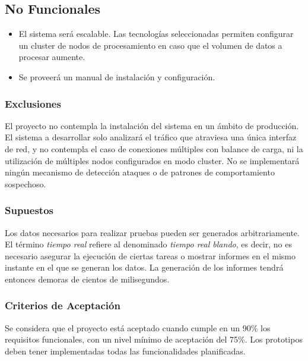 \subsection*{No Funcionales}
\begin{itemize}
	\item El sistema será escalable. Las tecnologías seleccionadas permiten configurar un cluster de nodos de procesamiento en caso que el volumen de datos a procesar aumente.
	\item Se proveerá un manual de instalación y configuración.
\end{itemize}
 
\subsubsection{Exclusiones}
El proyecto no contempla la instalación del sistema en un ámbito de producción. El sistema a desarrollar solo analizará el tráfico que atraviesa una única interfaz de red, y no contempla el caso de conexiones múltiples con balance de carga, ni la utilización de múltiples nodos configurados en modo cluster. No se implementará ningún mecanismo de detección ataques o de patrones de comportamiento sospechoso.

\subsubsection{Supuestos}
Los datos necesarios para realizar pruebas pueden ser generados arbitrariamente.
El término \textit{tiempo real} refiere al denominado \textit{tiempo real blando}, es decir, no es necesario asegurar la ejecución de ciertas tareas o mostrar informes en el mismo instante en el que se generan los datos. La generación de los informes tendrá entonces demoras de cientos de milisegundos.

\subsubsection{Criterios de Aceptación}
Se considera que el proyecto está aceptado cuando cumple en un 90\% los requisitos funcionales, con un nivel mínimo de aceptación del 75\%. Los prototipos deben tener implementadas todas las funcionalidades planificadas.